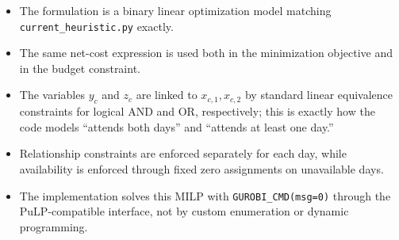 \begin{itemize}
    \item The formulation is a binary linear optimization model matching \texttt{current\_heuristic.py} exactly.
    \item The same net-cost expression is used both in the minimization objective and in the budget constraint.
    \item The variables $y_c$ and $z_c$ are linked to $x_{c,1},x_{c,2}$ by standard linear equivalence constraints for logical AND and OR, respectively; this is exactly how the code models ``attends both days'' and ``attends at least one day.''
    \item Relationship constraints are enforced separately for each day, while availability is enforced through fixed zero assignments on unavailable days.
    \item The implementation solves this MILP with \texttt{GUROBI\_CMD(msg=0)} through the PuLP-compatible interface, not by custom enumeration or dynamic programming.
\end{itemize}
